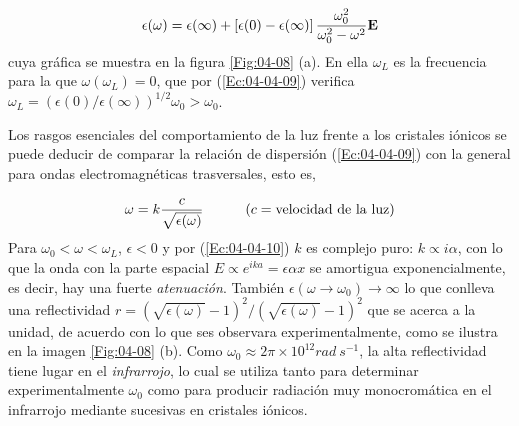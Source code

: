 \begin{eqnarray}
	\epsilon (\omega) = \epsilon(\infty) + \left[ \epsilon(0)-\epsilon(\infty) \right] \frac{\omega_0^2}{\omega_0^2 - \omega^2} \mathbf{E}\label{Ec:04-04-09}
\end{eqnarray}
cuya gráfica se muestra en la figura \ref{Fig:04-08} (a). En ella $\omega_L$ es la frecuencia para la que $\omega(\omega_L)=0$, que por  (\ref{Ec:04-04-09}) verifica $\omega_L = (\epsilon(0)/\epsilon(\infty))^{1/2} \omega_0 >\omega_0$.


Los rasgos esenciales del comportamiento de la luz frente a los cristales iónicos se puede deducir de comparar la relación de dispersión (\ref{Ec:04-04-09}) con la general para ondas electromagnéticas trasversales, esto es,

\begin{eqnarray}
	\omega = k \frac{c}{\sqrt{\epsilon(\omega)}} \quad \quad \quad (c = \text{velocidad de la luz})	\label{Ec:04-04-10}
\end{eqnarray}
Para $\omega_0 < \omega < \omega_L$, $\epsilon <0$ y por (\ref{Ec:04-04-10}) $k$ es complejo puro: $k \propto i \alpha$, con lo que la onda con la parte espacial $E \propto e^{ika} = \epsilon{\alpha x}$ se amortigua exponencialmente, es decir, hay una fuerte \textit{atenuación}. También $\epsilon (\omega \rightarrow \omega_0) \rightarrow \infty$ lo que conlleva una reflectividad $r= (\sqrt{\epsilon(\omega)}-1)^2 / (\sqrt{\epsilon(\omega)}-1)^2$ que se acerca a la unidad, de acuerdo con lo que ses observara experimentalmente, como se ilustra en la imagen \ref{Fig:04-08} (b). Como $\omega_0\approx 2 \pi \times 10^{12} \unit{rad \ s^{-1}}$, la alta reflectividad tiene lugar en el \textit{infrarrojo}, lo cual se utiliza tanto para determinar experimentalmente $\omega_0$ como para producir radiación muy monocromática en el infrarrojo mediante sucesivas en cristales iónicos.
